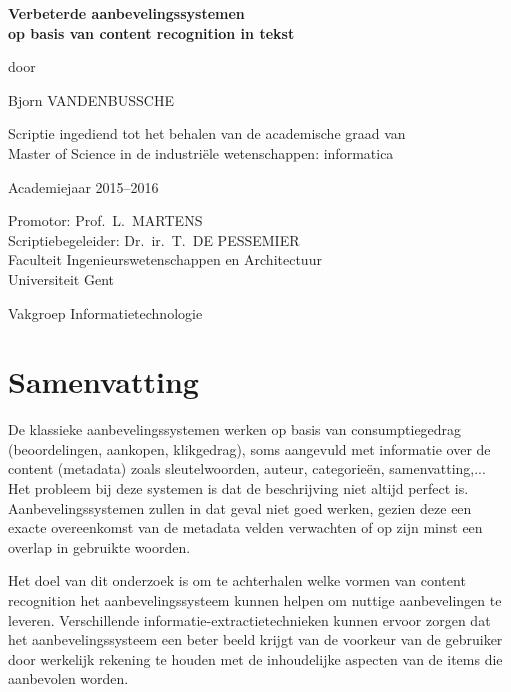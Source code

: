 
\newpage

{
\setlength{\baselineskip}{14pt}
\setlength{\parindent}{0pt}
\setlength{\parskip}{8pt}

\begin{center}

\noindent \textbf{\huge
Verbeterde aanbevelingssystemen\\[8pt]op basis van content recognition in tekst
}

door 

Bjorn VANDENBUSSCHE

Scriptie ingediend tot het behalen van de academische graad van\\ 
Master of Science in de industri\"ele wetenschappen: informatica

Academiejaar 2015--2016

Promotor: Prof.~L.~MARTENS\\
Scriptiebegeleider: Dr.~ir.~T.~DE PESSEMIER\\

Faculteit Ingenieurswetenschappen en Architectuur\\
Universiteit Gent

Vakgroep Informatietechnologie

\end{center}

\section*{Samenvatting}

De klassieke aanbevelingssystemen werken op basis van consumptiegedrag (beoordelingen, aankopen, klikgedrag), soms aangevuld met informatie over de content (metadata) zoals sleutelwoorden, auteur, categorie\"en, samenvatting,... Het probleem bij deze systemen is dat de beschrijving niet altijd perfect is.  Aanbevelingssystemen zullen in dat geval niet goed werken, gezien deze een exacte overeenkomst van de metadata velden verwachten of op zijn minst een overlap in gebruikte woorden.

Het doel van dit onderzoek is om te achterhalen welke vormen van content recognition het aanbevelingssysteem kunnen helpen om nuttige aanbevelingen te leveren. Verschillende informatie-extractietechnieken kunnen ervoor zorgen dat het aanbevelingssysteem een beter beeld krijgt van de voorkeur van de gebruiker door werkelijk rekening te houden met de inhoudelijke aspecten van de items die aanbevolen worden.

}
